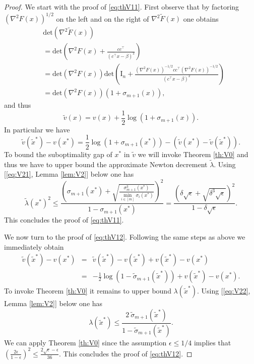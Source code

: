 \begin{proof}
We start with the proof of \eqref{eq:thV11}. First observe that by factoring $(\nabla^2 F(x))^{1/2}$ on the left and on the right of $\nabla^2 \tilde{F}(x)$ one obtains
\begin{align*}
& \mathrm{det}(\nabla^2 \tilde{F}(x)) \\
& = \mathrm{det}\left(\nabla^2 {F}(x) + \frac{cc^{\top}}{(c^{\top} x- \beta)^2} \right) \\
& = \mathrm{det}(\nabla^2 {F}(x)) \mathrm{det}\left(\mathrm{I}_n + \frac{(\nabla^2 {F}(x))^{-1/2} c c^{\top} (\nabla^2 {F}(x))^{-1/2}}{(c^{\top} x- \beta)^2}\right) \\
& = \mathrm{det}(\nabla^2 {F}(x)) (1+\sigma_{m+1}(x)) ,
\end{align*}
and thus
$$\tilde{v}(x) = v(x) + \frac{1}{2} \log(1+ \sigma_{m+1}(x)) .$$
In particular we have
$$\tilde{v}(\tilde{x}^*) - v(x^*) = \frac{1}{2} \log(1+ \sigma_{m+1}(x^*)) - (\tilde{v}(x^*) - \tilde{v}(\tilde{x}^*)) .$$
To bound the suboptimality gap of $x^*$ in $\tilde{v}$ we will invoke Theorem \ref{th:V0} and thus we have to upper bound the approximate Newton decrement $\tilde{\lambda}$.
Using [\eqref{eq:V21}, Lemma \ref{lem:V2}] below one has 
$$\tilde{\lambda} (x^*)^2 \leq \frac{\left(\sigma_{m+1}(x^*) + \sqrt{\frac{\sigma_{m+1}^3(x^*)}{\min_{i \in [m]} \sigma_i(x^*)}}\right)^2}{1-\sigma_{m+1}(x^*)} = \frac{\left(\delta \sqrt{\epsilon} + \sqrt{\delta^{3} \sqrt{\epsilon}}\right)^2}{1- \delta \sqrt{\epsilon}}  .$$
This concludes the proof of \eqref{eq:thV11}.
\newline

We now turn to the proof of \eqref{eq:thV12}. Following the same steps as above we immediately obtain
\begin{eqnarray*}
\tilde{v}(\tilde{x}^*) - v(x^*) & = & \tilde{v}(\tilde{x}^*) - v(\tilde{x}^*)+v(\tilde{x}^*)- v(x^*)  \\
& = & - \frac{1}{2} \log(1 - \tilde{\sigma}_{m+1}(\tilde{x}^*)) + v(\tilde{x}^*)- v(x^*).
\end{eqnarray*}
To invoke Theorem \ref{th:V0} it remains to upper bound $\lambda(\tilde{x}^*)$. Using [\eqref{eq:V22}, Lemma \ref{lem:V2}] below one has
$$ \lambda(\tilde{x}^*) \leq \frac{2 \ \tilde{\sigma}_{m+1}(\tilde{x}^*)}{1 - \tilde{\sigma}_{m+1}(\tilde{x}^*)} .$$
We can apply Theorem \ref{th:V0} since the assumption $\epsilon \leq 1/4$ implies that $\left(\frac{2 \epsilon}{1-\epsilon}\right)^2 \leq \frac{2 \sqrt{\epsilon} - \epsilon}{36}$. This concludes the proof of \eqref{eq:thV12}.
\end{proof}

